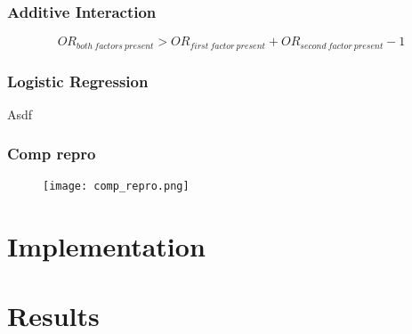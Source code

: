 \documentclass{beamer}
\begin{document}
\begin{frame}
\frametitle{Additive Interaction}

\begin{equation*}
OR_{both\:factors\:present}>OR_{first\:factor\:present}+OR_{second\:factor\:present}-1
\end{equation*}

\end{frame}

\begin{frame}
\frametitle{Logistic Regression}
 Asdf
\end{frame}




\begin{frame}

\frametitle{Comp repro}
\begin{figure}[h]
    \centering
    \texttt{[image: comp\_repro.png]}
    \label{fig:speed}
\end{figure}

\end{frame}



\section{Implementation}

\section{Results}



\end{document}
